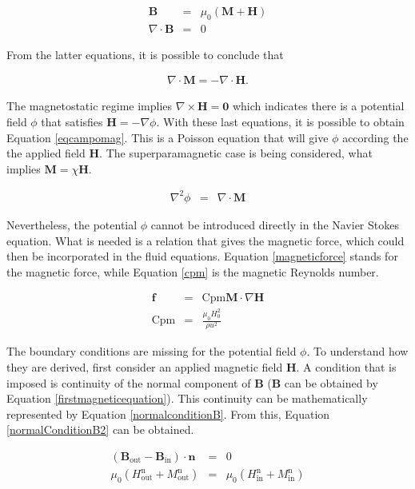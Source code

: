 \documentclass[journal]{IEEEtran}
\begin{document}
\begin{eqnarray}
\mathbf{B} &=& \mu_0(\mathbf{M}+\mathbf{H})\label{firstmagneticequation}\\
\nabla\cdot \mathbf{B} & = & 0\label{secondmagneticequation}
\end{eqnarray}

From the latter equations, it is possible to conclude that 

\begin{eqnarray}
\nabla\cdot \mathbf{M} = -\nabla\cdot\mathbf{H}	\label{mh1}.
\end{eqnarray}

The magnetostatic regime implies $\nabla\times \mathbf{H} = \mathbf{0}$ which indicates there is a potential field $\phi$ that satisfies $\mathbf{H} = -\nabla \phi$. With these last equations, it is possible to obtain Equation \ref{eqcampomag}. This is a Poisson equation that will give $\phi$ according the the applied field $\mathbf{H}$. The superparamagnetic case is being considered, what implies $\mathbf{M} = \chi \mathbf{H}$. 

\begin{eqnarray}
\nabla^2\phi &=& \nabla\cdot \mathbf{M}\label{eqcampomag}
\end{eqnarray}

Nevertheless, the potential $\phi$ cannot be introduced directly in the Navier Stokes equation. What is needed is a relation that gives the magnetic force, which could then be incorporated in the fluid equations. Equation \ref{magneticforce} stands for the magnetic force, while Equation \ref{cpm} is the magnetic Reynolds number.

\begin{eqnarray}
\mathbf{f} & = & \mathrm{Cpm} \mathbf{M}\cdot \nabla \mathbf{H}\label{magneticforce}\\
\mathrm{Cpm} & = & \frac{\mu_0 H_0^2}{\rho u^2}\label{cpm}
\end{eqnarray}


The boundary conditions are missing for the potential field $\phi$. To understand how they are derived, first consider an applied magnetic field $\mathbf{H}$. A condition that is imposed is continuity of the normal component of $\mathbf{B}$ ($\mathbf{B}$ can be obtained by Equation \ref{firstmagneticequation}). This continuity can be mathematically represented by Equation \ref{normalconditionB}. From this, Equation \ref{normalConditionB2} can be obtained.

\begin{eqnarray}
\left(\mathbf{B}_{\mathrm{out}} - \mathbf{B}_{\mathrm{in}}\right)\cdot \mathbf{n} &=& 0 \label{normalconditionB}\\
\mu_0 (H_{\mathrm{out}}^{\mathrm{n}} + M_{\mathrm{out}}^{\mathrm{n}}) &=&  \mu_0(H_{\mathrm{in}}^{\mathrm{n}}+M_{\mathrm{in}}^{\mathrm{n}})\label{normalConditionB2}
\end{eqnarray}
\end{document}
